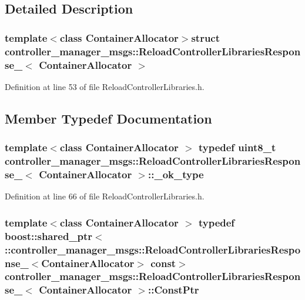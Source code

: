 \subsection{\-Detailed \-Description}
\subsubsection*{template$<$class Container\-Allocator$>$struct controller\-\_\-manager\-\_\-msgs\-::\-Reload\-Controller\-Libraries\-Response\-\_\-$<$ Container\-Allocator $>$}



\-Definition at line 53 of file \-Reload\-Controller\-Libraries.\-h.



\subsection{\-Member \-Typedef \-Documentation}
\subsubsection[{\-\_\-ok\-\_\-type}]{\setlength{\rightskip}{0pt plus 5cm}template$<$class Container\-Allocator $>$ typedef uint8\-\_\-t {\bf controller\-\_\-manager\-\_\-msgs\-::\-Reload\-Controller\-Libraries\-Response\-\_\-}$<$ \-Container\-Allocator $>$\-::{\bf \-\_\-ok\-\_\-type}}\label{structcontroller__manager__msgs_1_1ReloadControllerLibrariesResponse___a93dfa80b1c7b0e68c7a9b9ecd1d1b329}


\-Definition at line 66 of file \-Reload\-Controller\-Libraries.\-h.

\subsubsection[{\-Const\-Ptr}]{\setlength{\rightskip}{0pt plus 5cm}template$<$class Container\-Allocator $>$ typedef boost\-::shared\-\_\-ptr$<$ \-::{\bf controller\-\_\-manager\-\_\-msgs\-::\-Reload\-Controller\-Libraries\-Response\-\_\-}$<$\-Container\-Allocator$>$ const$>$ {\bf controller\-\_\-manager\-\_\-msgs\-::\-Reload\-Controller\-Libraries\-Response\-\_\-}$<$ \-Container\-Allocator $>$\-::{\bf \-Const\-Ptr}}\label{structcontroller__manager__msgs_1_1ReloadControllerLibrariesResponse___a99e9847f9d8926f3cdfc7e0f1d378544}


